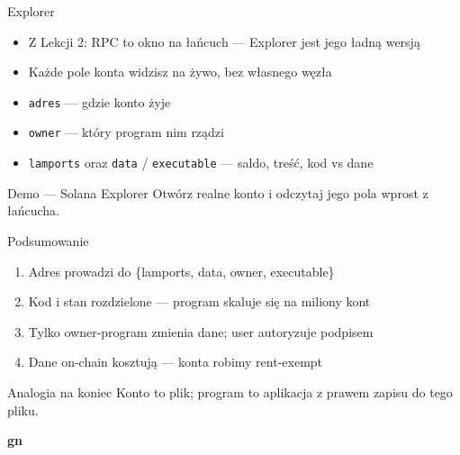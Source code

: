 \begin{frame}{Explorer}
  \begin{itemize}
    \item Z Lekcji 2: RPC to okno na łańcuch --- Explorer jest jego ładną wersją
    \item Każde pole konta widzisz na żywo, bez własnego węzła
    \item \texttt{adres} --- gdzie konto żyje
    \item \texttt{owner} --- który program nim rządzi
    \item \texttt{lamports} oraz \texttt{data} / \texttt{executable} --- saldo, treść, kod vs dane
  \end{itemize}
  \vspace{0.25cm}
  \begin{exampleblock}{Demo --- Solana Explorer}
    Otwórz realne konto i odczytaj jego pola wprost z łańcucha.
  \end{exampleblock}
\end{frame}

\begin{frame}{Podsumowanie}
  \begin{enumerate}
    \item Adres prowadzi do \{lamports, data, owner, executable\}
    \item Kod i stan rozdzielone --- program skaluje się na miliony kont
    \item Tylko owner-program zmienia dane; user autoryzuje podpisem
    \item Dane on-chain kosztują --- konta robimy rent-exempt
  \end{enumerate}
  \vspace{0.2cm}
  \begin{exampleblock}{Analogia na koniec}
    Konto to plik; program to aplikacja z prawem zapisu do tego pliku.
  \end{exampleblock}
\end{frame}

\begin{frame}[plain]
  \begin{center}
    \vfill
    {\Huge\bfseries\color{stplwhite} gn}
    \vfill
  \end{center}
\end{frame}


